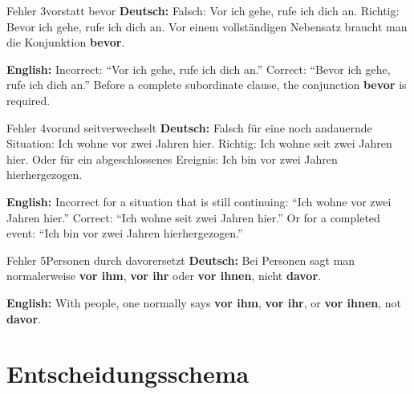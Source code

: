 \documentclass[a4paper,11pt]{article}
\newcommand{\GermanText}[1]{\textbf{Deutsch: }#1\par}
\newcommand{\EnglishText}[1]{{\small\color{SoftGray}\textbf{English: }#1\par}}
\begin{document}
        \begin{grammarentry}{Fehler 3}{\glqq vor\grqq statt \glqq bevor\grqq}
            \GermanText{Falsch: \glqq Vor ich gehe, rufe ich dich an.\grqq{} Richtig: \glqq Bevor ich gehe, rufe ich dich an.\grqq{} Vor einem vollständigen Nebensatz braucht man die Konjunktion \textbf{bevor}.}
            \EnglishText{Incorrect: ``Vor ich gehe, rufe ich dich an.'' Correct: ``Bevor ich gehe, rufe ich dich an.'' Before a complete subordinate clause, the conjunction \textbf{bevor} is required.}
        \end{grammarentry}

        \begin{grammarentry}{Fehler 4}{\glqq vor\grqq und \glqq seit\grqq verwechselt}
            \GermanText{Falsch für eine noch andauernde Situation: \glqq Ich wohne vor zwei Jahren hier.\grqq{} Richtig: \glqq Ich wohne seit zwei Jahren hier.\grqq{} Oder für ein abgeschlossenes Ereignis: \glqq Ich bin vor zwei Jahren hierhergezogen.\grqq}
            \EnglishText{Incorrect for a situation that is still continuing: ``Ich wohne vor zwei Jahren hier.'' Correct: ``Ich wohne seit zwei Jahren hier.'' Or for a completed event: ``Ich bin vor zwei Jahren hierhergezogen.''}
        \end{grammarentry}

        \begin{grammarentry}{Fehler 5}{Personen durch \glqq davor\grqq ersetzt}
            \GermanText{Bei Personen sagt man normalerweise \textbf{vor ihm}, \textbf{vor ihr} oder \textbf{vor ihnen}, nicht \textbf{davor}.}
            \EnglishText{With people, one normally says \textbf{vor ihm}, \textbf{vor ihr}, or \textbf{vor ihnen}, not \textbf{davor}.}
        \end{grammarentry}


    \newpage
    \section{Entscheidungsschema}
\end{document}
